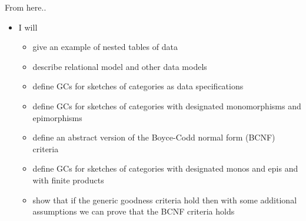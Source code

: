 \begin{frame}{From here..}
\begin{itemize}
\item I will
\begin{itemize}
   \item give an example of nested tables of data
   \item describe relational model  and other data models 
   \pause \item define GCs for sketches of categories as data specifications 
   \pause \item define GCs for sketches of categories with designated monomorphisms and epimorphisms
   \pause \item define an abstract version of the Boyce-Codd normal form (BCNF) criteria 
   \pause \item define GCs for sketches of categories with designated monos and epis and with finite products
  \pause \item  show that if the generic goodness criteria hold then with some additional assumptions we can prove that the BCNF criteria holds
\end{itemize}
\end{itemize}
\end{frame}

